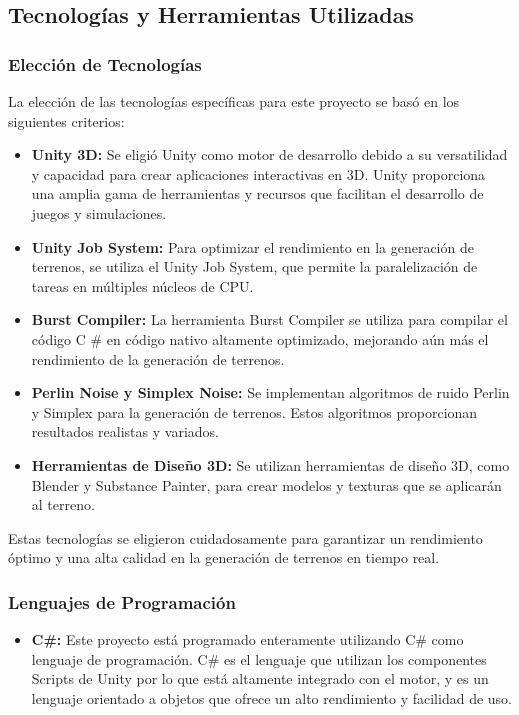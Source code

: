 \subsection{Tecnologías y Herramientas Utilizadas}

\subsubsection{Elección de Tecnologías}
La elección de las tecnologías específicas para este proyecto se basó en los siguientes criterios:

\begin{itemize}
    \item \textbf{Unity 3D:} Se eligió Unity como motor de desarrollo debido a su versatilidad y capacidad para crear aplicaciones interactivas en 3D. Unity proporciona una amplia gama de herramientas y recursos que facilitan el desarrollo de juegos y simulaciones.
    
    
    \item \textbf{Unity Job System:} Para optimizar el rendimiento en la generación de terrenos, se utiliza el Unity Job System, que permite la paralelización de tareas en múltiples núcleos de CPU.
    
    \item \textbf{Burst Compiler:} La herramienta Burst Compiler se utiliza para compilar el código C \# en código nativo altamente optimizado, mejorando aún más el rendimiento de la generación de terrenos.
    
    \item \textbf{Perlin Noise y Simplex Noise:} Se implementan algoritmos de ruido Perlin y Simplex para la generación de terrenos. Estos algoritmos proporcionan resultados realistas y variados.
    
    \item \textbf{Herramientas de Diseño 3D:} Se utilizan herramientas de diseño 3D, como Blender y Substance Painter, para crear modelos y texturas que se aplicarán al terreno.
\end{itemize}

Estas tecnologías se eligieron cuidadosamente para garantizar un rendimiento óptimo y una alta calidad en la generación de terrenos en tiempo real.

\subsubsection{Lenguajes de Programación}
\begin{itemize}
    \item \textbf{C\#:} Este proyecto está programado enteramente utilizando C\# como lenguaje de programación. C\# es el lenguaje que utilizan los componentes Scripts de Unity por lo que está altamente integrado con el motor, y es un lenguaje orientado a objetos que ofrece un alto rendimiento y facilidad de uso.
    
\end{itemize}

